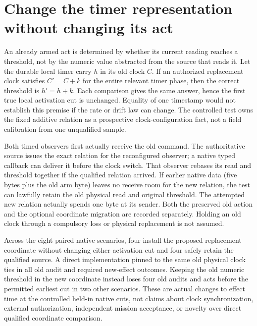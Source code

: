 \documentclass{article}
\begin{document}
\section*{Change the timer representation without changing its act}
An already armed act is determined by whether its current
reading reaches a threshold, not by the numeric value abstracted
from the source that reads it. Let the durable local timer carry
\(h\) in its old clock \(C\). If an authorized replacement clock
satisfies \(C'=C+k\) for the entire relevant timer phase, then
the correct threshold is \(h'=h+k\). Each comparison gives the
same answer, hence the first true local activation cut is
unchanged. Equality of one timestamp would not establish this
premise if the rate or drift law can change. The controlled
test owns the fixed additive relation as a prospective
clock-configuration fact, not a field calibration from one
unqualified sample.

Both timed observers first actually receive the old command.
The authoritative source issues the exact relation for the
reconfigured observer; a native typed callback can deliver it
before the clock switch. That observer rebases its read and
threshold together if the qualified relation arrived. If
earlier native data (five bytes plus the old arm byte) leaves
no receive room for the new relation, the test can lawfully
retain the old physical read and original threshold. The
attempted new relation actually spends one byte at its sender.
Both the preserved old action and the optional coordinate
migration are recorded separately. Holding an old clock through
a compulsory loss or physical replacement is not assumed.

Across the eight paired native scenarios, four install the
proposed replacement coordinate without changing either
activation cut and four safely retain the qualified source.
A direct implementation pinned to the same old physical clock
ties in all old audit and required new-effect outcomes.
Keeping the old numeric threshold in the new coordinate
instead loses four old audits and acts before the permitted
earliest cut in two other scenarios. These are actual changes
to effect time at the controlled held-in native cuts, not
claims about clock synchronization, external authorization,
independent mission acceptance, or novelty over direct
qualified coordinate comparison.
\end{document}
